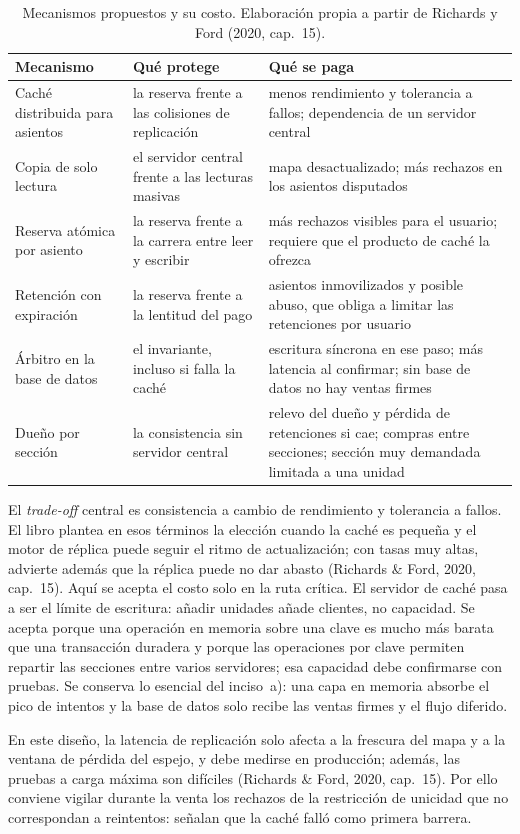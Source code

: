 \begin{table}[H]
  \centering
  \caption{Mecanismos propuestos y su costo. Elaboración propia a partir de Richards y
    Ford (2020, cap.~15).}
  \label{tab:p2b-tradeoffs}
  \small
  \renewcommand{\arraystretch}{1.35}
  \begin{tabularx}{\textwidth}{>{\raggedright\arraybackslash}p{3.6cm} >{\raggedright\arraybackslash}X >{\raggedright\arraybackslash}X}
    \toprule
    \textbf{Mecanismo} & \textbf{Qué protege} & \textbf{Qué se paga} \\
    \midrule
    Caché distribuida para asientos &
      la reserva frente a las colisiones de replicación &
      menos rendimiento y tolerancia a fallos; dependencia de un servidor central \\
    Copia de solo lectura &
      el servidor central frente a las lecturas masivas &
      mapa desactualizado; más rechazos en los asientos disputados \\
    Reserva atómica por asiento &
      la reserva frente a la carrera entre leer y escribir &
      más rechazos visibles para el usuario; requiere que el producto de caché la ofrezca \\
    Retención con expiración &
      la reserva frente a la lentitud del pago &
      asientos inmovilizados y posible abuso, que obliga a limitar las retenciones por usuario \\
    Árbitro en la base de datos &
      el invariante, incluso si falla la caché &
      escritura síncrona en ese paso; más latencia al confirmar; sin base de datos no hay ventas firmes \\
    Dueño por sección &
      la consistencia sin servidor central &
      relevo del dueño y pérdida de retenciones si cae; compras entre secciones; sección muy demandada limitada a una unidad \\
    \bottomrule
  \end{tabularx}
\end{table}

El \emph{trade-off} central es consistencia a cambio de rendimiento y tolerancia a
fallos. El libro plantea en esos términos la elección cuando la caché es pequeña y el
motor de réplica puede seguir el ritmo de actualización; con tasas muy altas, advierte
además que la réplica puede no dar abasto (Richards \& Ford, 2020, cap.~15). Aquí se
acepta el costo solo en la ruta crítica. El servidor de caché pasa a ser el límite de
escritura: añadir unidades añade clientes, no capacidad. Se acepta porque una operación
en memoria sobre una clave es mucho más barata que una transacción duradera y porque
las operaciones por clave permiten repartir las secciones entre varios servidores; esa
capacidad debe confirmarse con pruebas. Se conserva lo esencial del inciso~a): una capa
en memoria absorbe el pico de intentos y la base de datos solo recibe las ventas firmes
y el flujo diferido.

En este diseño, la latencia de replicación solo afecta a la frescura del mapa y a la
ventana de pérdida del espejo, y debe medirse en producción; además, las pruebas a carga
máxima son difíciles (Richards \& Ford, 2020, cap.~15). Por ello conviene vigilar
durante la venta los rechazos de la restricción de unicidad que no correspondan a
reintentos: señalan que la caché falló como primera barrera.
